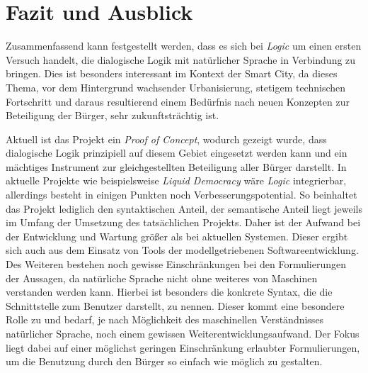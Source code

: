 \documentclass[11pt,a4paper,bibtotocnumbered]{scrreprt}
\begin{document}
\chapter{Fazit und Ausblick} %
Zusammenfassend kann festgestellt werden, dass es sich bei \emph{Logic} um einen ersten Versuch handelt, die dialogische Logik mit natürlicher Sprache in Verbindung zu bringen.
Dies ist besonders interessant im Kontext der Smart City, da dieses Thema, vor dem Hintergrund wachsender Urbanisierung, stetigem technischen Fortschritt und daraus resultierend einem Bedürfnis nach neuen Konzepten zur Beteiligung der Bürger, sehr zukunftsträchtig ist.

Aktuell ist das Projekt ein \textit{Proof of Concept}, wodurch gezeigt wurde, dass dialogische Logik prinzipiell auf diesem Gebiet eingesetzt werden kann und ein mächtiges Instrument zur gleichgestellten Beteiligung aller Bürger darstellt.
In aktuelle Projekte wie beispielsweise \emph{Liquid Democracy} \cite{PiratenLiquidDemo} wäre \emph{Logic} integrierbar, allerdings besteht in einigen Punkten noch Verbesserungspotential.
So beinhaltet das Projekt lediglich den syntaktischen Anteil, der semantische Anteil liegt jeweils im Umfang der Umsetzung des tatsächlichen Projekts. Daher ist der Aufwand bei der Entwicklung und Wartung größer als bei aktuellen Systemen. Dieser ergibt sich auch aus dem Einsatz von Tools der modellgetriebenen Softwareentwicklung.
Des Weiteren bestehen noch gewisse Einschränkungen bei den Formulierungen der Aussagen, da natürliche Sprache nicht ohne weiteres von Maschinen verstanden werden kann. Hierbei ist besonders die konkrete Syntax, die die Schnittstelle zum Benutzer darstellt, zu nennen. Dieser kommt eine besondere Rolle zu und bedarf, je nach Möglichkeit des maschinellen Verständnisses natürlicher Sprache, noch einem gewissen Weiterentwicklungsaufwand. Der Fokus liegt dabei auf einer möglichst geringen Einschränkung erlaubter Formulierungen, um die Benutzung durch den Bürger so einfach wie möglich zu gestalten.
\end{document}
